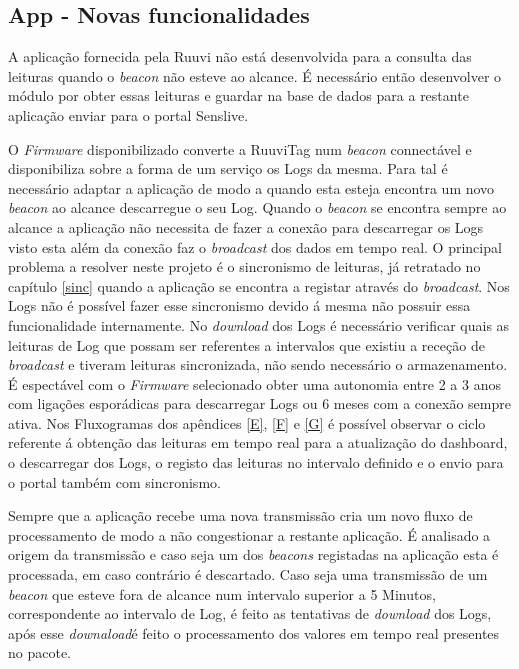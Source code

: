 \subsection{App - Novas funcionalidades}

\par A aplicação fornecida pela Ruuvi não está desenvolvida para a consulta das leituras quando o \textit{beacon} não esteve ao alcance. É necessário então desenvolver o módulo por obter essas leituras e guardar na base de dados para a restante aplicação enviar para o portal Senslive.

\par O \textit{Firmware} disponibilizado converte a RuuviTag num \textit{beacon} connectável e disponibiliza sobre a forma de um serviço os Logs da mesma\cite{ruuvitlog}. Para tal é necessário adaptar a aplicação de modo a quando esta esteja encontra um novo \textit{beacon} ao alcance descarregue o seu Log. Quando o \textit{beacon} se encontra sempre ao alcance a aplicação não necessita de fazer a conexão para descarregar os Logs visto esta além da conexão faz o \textit{broadcast} dos dados em tempo real. O principal problema a resolver neste projeto é o sincronismo de leituras, já retratado no capítulo \ref{sinc} quando a aplicação se encontra a registar através do \textit{broadcast}. Nos Logs não é possível fazer esse sincronismo devido á mesma não possuir essa funcionalidade internamente. No \textit{download} dos Logs é necessário verificar quais as leituras de Log que possam ser referentes a intervalos que existiu a receção de \textit{broadcast} e tiveram leituras sincronizada, não sendo necessário o armazenamento. É espectável com o \textit{Firmware} selecionado obter uma autonomia entre 2 a 3 anos com ligações esporádicas para descarregar Logs ou 6 meses com a conexão sempre ativa. Nos Fluxogramas dos apêndices  \ref{E}, \ref{F} e \ref{G} é possível observar o ciclo referente á obtenção das leituras em tempo real para a atualização do dashboard, o descarregar dos Logs, o registo das leituras no intervalo definido e o envio para o portal também com sincronismo.

\par Sempre que a aplicação recebe uma nova transmissão cria um novo fluxo de processamento de modo a não congestionar a restante aplicação. É analisado a origem da transmissão e caso seja um dos \textit{beacons} registadas na aplicação esta é processada, em caso contrário é descartado. Caso seja uma transmissão de um \textit{beacon} que esteve fora de alcance num intervalo superior a 5 Minutos, correspondente ao intervalo de Log, é feito as tentativas de \textit{download} dos Logs, após esse \textit{downaload}é feito o processamento dos valores em tempo real presentes no pacote. 

